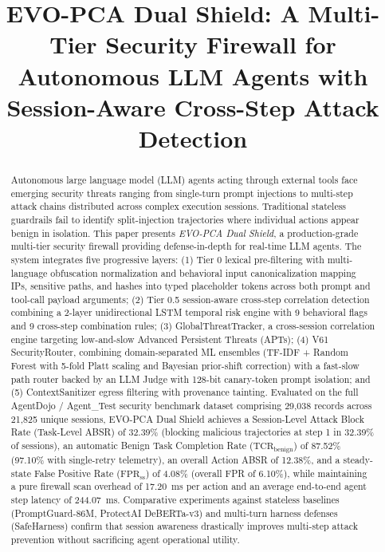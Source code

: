 \documentclass[conference]{IEEEtran}
\begin{document}
\title{EVO-PCA Dual Shield: A Multi-Tier Security Firewall for Autonomous LLM Agents with Session-Aware Cross-Step Attack Detection}

\author{
}

\maketitle

\begin{abstract}
Autonomous large language model (LLM) agents acting through external tools face emerging security threats ranging from single-turn prompt injections to multi-step attack chains distributed across complex execution sessions. Traditional stateless guardrails fail to identify split-injection trajectories where individual actions appear benign in isolation. This paper presents \textit{EVO-PCA Dual Shield}, a production-grade multi-tier security firewall providing defense-in-depth for real-time LLM agents. The system integrates five progressive layers: (1) Tier 0 lexical pre-filtering with multi-language obfuscation normalization and behavioral input canonicalization mapping IPs, sensitive paths, and hashes into typed placeholder tokens across both prompt and tool-call payload arguments; (2) Tier 0.5 session-aware cross-step correlation detection combining a 2-layer unidirectional LSTM temporal risk engine with 9 behavioral flags and 9 cross-step combination rules; (3) GlobalThreatTracker, a cross-session correlation engine targeting low-and-slow Advanced Persistent Threats (APTs); (4) V61 SecurityRouter, combining domain-separated ML ensembles (TF-IDF + Random Forest with 5-fold Platt scaling and Bayesian prior-shift correction) with a fast-slow path router backed by an LLM Judge with 128-bit canary-token prompt isolation; and (5) ContextSanitizer egress filtering with provenance tainting. Evaluated on the full AgentDojo / Agent\_Test security benchmark dataset comprising 29,038 records across 21,825 unique sessions, EVO-PCA Dual Shield achieves a Session-Level Attack Block Rate (Task-Level ABSR) of 32.39\% (blocking malicious trajectories at step 1 in 32.39\% of sessions), an automatic Benign Task Completion Rate ($\text{TCR}_{\text{benign}}$) of 87.52\% (97.10\% with single-retry telemetry), an overall Action ABSR of 12.38\%, and a steady-state False Positive Rate ($\text{FPR}_{\text{ss}}$) of 4.08\% (overall FPR of 6.10\%), while maintaining a pure firewall scan overhead of 17.20~ms per action and an average end-to-end agent step latency of 244.07~ms. Comparative experiments against stateless baselines (PromptGuard-86M, ProtectAI DeBERTa-v3) and multi-turn harness defenses (SafeHarness) confirm that session awareness drastically improves multi-step attack prevention without sacrificing agent operational utility.
\end{abstract}
\end{document}
